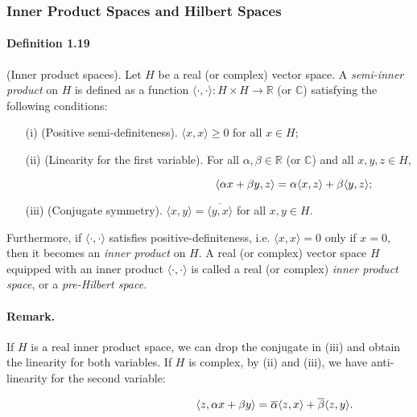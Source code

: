 \documentclass{article}
\begin{document}
\newpage
\subsubsection{Inner Product Spaces and Hilbert Spaces}
\paragraph{Definition 1.19\label{def:1.19}} (Inner product spaces). Let $H$ be a real (or complex) vector space. A \textit{semi-inner product} on $H$ is defined as a function $\langle\cdot,\cdot\rangle:H\times H\to\mathbb{R}$ (or $\mathbb{C}$) satisfying the following conditions:
\begin{itemize}
	\item[(i)] (Positive semi-definiteness). $\langle x,x\rangle\geq 0$ for all $x\in H$;
	\item[(ii)] (Linearity for the first variable). For all $\alpha,\beta\in\mathbb{R}$ (or $\mathbb{C}$) and all $x,y,z\in H$, \vspace{0.30cm}
	
	$\hspace{5.9cm}\langle\alpha x+\beta y,z\rangle = \alpha\langle x,z\rangle + \beta\langle y,z\rangle;$
	
	\vspace{0.30cm}
    \item[(iii)] (Conjugate symmetry). $\langle x,y\rangle = \overline{\langle y,x\rangle}$ for all $x,y\in H$.
\end{itemize}
Furthermore, if $\langle\cdot,\cdot\rangle$ satisfies positive-definiteness, i.e. $\langle x,x\rangle = 0$ only if $x=0$, then it becomes an \textit{inner product} on $H$. A real (or complex) vector space $H$ equipped with an inner product $\langle\cdot,\cdot\rangle$ is called a real (or complex) \textit{inner product space}, or a \textit{pre-Hilbert space}.

\paragraph{Remark.} If $H$ is a real inner product space, we can drop the conjugate in (iii) and obtain the linearity for both variables. If $H$ is complex, by (ii) and (iii), we have anti-linearity for the second variable: \vspace{0.30cm}

$\hspace{5.9cm}\langle z,\alpha x+\beta y\rangle = \overline{\alpha}\langle z,x\rangle + \overline{\beta}\langle z,y\rangle.$
\end{document}
